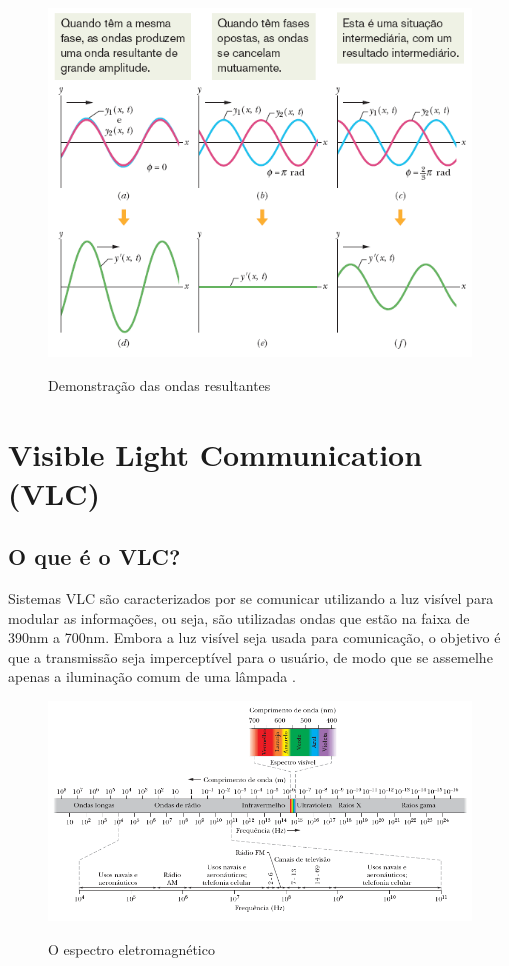 \begin{figure}[!htbp]
  \caption{Demonstração das ondas resultantes}
  \includegraphics[scale=0.55]{images/ondas_interferencia.png}
  \label{fig:ondas_inter}
\end{figure}


\section{Visible Light Communication (VLC)}

\subsection{O que é o VLC?}

Sistemas VLC são caracterizados por se comunicar utilizando a luz visível para modular as informações, ou seja, são utilizadas ondas que estão na faixa de 390nm a 700nm. Embora a luz visível seja usada para comunicação, o objetivo é que a transmissão seja imperceptível para o usuário, de modo que se assemelhe apenas a iluminação comum de uma lâmpada \cite{matheus2017comunicaccao}.

\begin{figure}[!htbp]
  \caption{O espectro eletromagnético}
  \includegraphics[scale=0.6]{images/espectro_eletromagnetico.png}
  \label{fig:espectro_eletromagnetico}
\end{figure}

